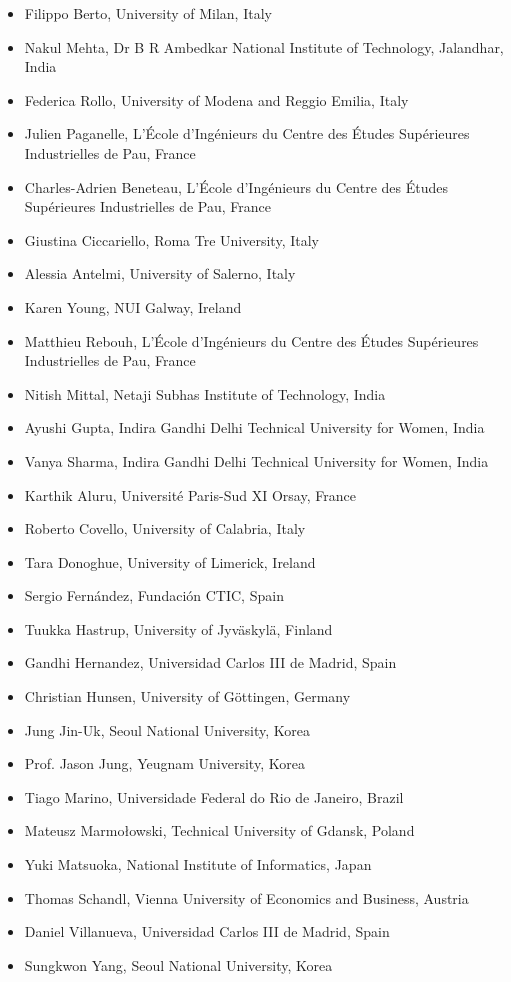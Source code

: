 \documentclass[10pt,a4paper]{res} %
\begin{document}
\begin{resume}
\begin{itemize} \itemsep -2pt %
\item Filippo Berto, University of Milan, Italy
\item Nakul Mehta, Dr B R Ambedkar National Institute of Technology, Jalandhar, India
\item Federica Rollo, University of Modena and Reggio Emilia, Italy
\item Julien Paganelle, L'\'{E}cole d'Ing\'{e}nieurs du Centre des \'{E}tudes Sup\'{e}rieures Industrielles de Pau, France
\item Charles-Adrien Beneteau, L'\'{E}cole d'Ing\'{e}nieurs du Centre des \'{E}tudes Sup\'{e}rieures Industrielles de Pau, France
\item Giustina Ciccariello, Roma Tre University, Italy
\item Alessia Antelmi, University of Salerno, Italy
\item Karen Young, NUI Galway, Ireland
\item Matthieu Rebouh, L'\'{E}cole d'Ing\'{e}nieurs du Centre des \'{E}tudes Sup\'{e}rieures Industrielles de Pau, France
\item Nitish Mittal, Netaji Subhas Institute of Technology, India
\item Ayushi Gupta, Indira Gandhi Delhi Technical University for Women, India
\item Vanya Sharma, Indira Gandhi Delhi Technical University for Women, India
\item Karthik Aluru, Universit\'{e} Paris-Sud XI Orsay, France
\item Roberto Covello, University of Calabria, Italy
\item Tara Donoghue, University of Limerick, Ireland
\item Sergio Fern\'{a}ndez, Fundaci\'{o}n CTIC, Spain
\item Tuukka Hastrup, University of Jyv\"{a}skyl\"{a}, Finland
\item Gandhi Hernandez, Universidad Carlos III de Madrid, Spain
\item Christian Hunsen, University of G\"{o}ttingen, Germany
\item Jung Jin-Uk, Seoul National University, Korea
\item Prof. Jason Jung, Yeugnam University, Korea
\item Tiago Marino, Universidade Federal do Rio de Janeiro, Brazil
\item Mateusz Marmo{\l}owski, Technical University of Gdansk, Poland
\item Yuki Matsuoka, National Institute of Informatics, Japan
\item Thomas Schandl, Vienna University of Economics and Business, Austria
\item Daniel Villanueva, Universidad Carlos III de Madrid, Spain
\item Sungkwon Yang, Seoul National University, Korea
\end{itemize}


\end{resume}
\end{document}
